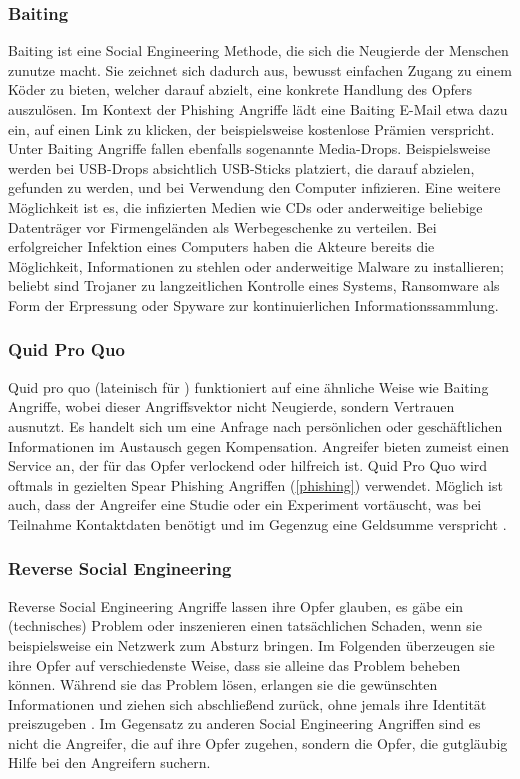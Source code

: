 \subsubsection{Baiting}
\label{baiting}
Baiting ist eine Social Engineering Methode, die sich die Neugierde der Menschen zunutze macht.
Sie zeichnet sich dadurch aus, bewusst einfachen Zugang zu einem Köder zu bieten, welcher darauf abzielt, eine konkrete Handlung
des Opfers auszulösen. Im Kontext der Phishing Angriffe lädt eine Baiting E-Mail etwa dazu ein, auf einen Link zu klicken, der beispielsweise
kostenlose Prämien verspricht. Unter Baiting Angriffe fallen ebenfalls sogenannte Media-Drops. Beispielsweise werden bei USB-Drops absichtlich
USB-Sticks platziert, die darauf abzielen, gefunden zu werden, und bei Verwendung den Computer infizieren. Eine weitere Möglichkeit ist es, die
infizierten Medien wie CDs oder anderweitige beliebige Datenträger vor Firmengeländen als Werbegeschenke zu verteilen. Bei erfolgreicher Infektion eines Computers haben die Akteure bereits
die Möglichkeit, Informationen zu stehlen oder anderweitige Malware zu installieren; beliebt sind Trojaner zu langzeitlichen Kontrolle eines
Systems, Ransomware als Form der Erpressung  oder Spyware zur kontinuierlichen Informationssammlung.

\subsubsection{Quid Pro Quo}
Quid pro quo (lateinisch für ) funktioniert auf eine ähnliche Weise wie Baiting Angriffe, wobei dieser Angriffsvektor nicht
Neugierde, sondern Vertrauen ausnutzt. Es handelt sich um eine Anfrage nach persönlichen oder geschäftlichen Informationen im Austausch gegen Kompensation.
Angreifer bieten zumeist einen Service an, der für das Opfer verlockend oder hilfreich ist. Quid Pro Quo wird oftmals in gezielten
Spear Phishing Angriffen (\autoref{phishing}) verwendet. Möglich ist auch, dass der Angreifer eine Studie oder ein Experiment vortäuscht, was bei Teilnahme Kontaktdaten
benötigt und im Gegenzug eine Geldsumme verspricht .

\subsubsection{Reverse Social Engineering}
Reverse Social Engineering Angriffe lassen ihre Opfer glauben, es gäbe ein (technisches) Problem oder inszenieren einen tatsächlichen Schaden, wenn sie beispielsweise
ein Netzwerk zum Absturz bringen. Im Folgenden überzeugen sie ihre Opfer auf verschiedenste Weise, dass sie alleine das Problem beheben können. Während sie das Problem
lösen, erlangen sie die gewünschten Informationen und ziehen sich abschließend zurück, ohne jemals ihre Identität preiszugeben .
Im Gegensatz zu anderen Social Engineering Angriffen sind es nicht die Angreifer, die auf ihre Opfer zugehen, sondern die Opfer, die gutgläubig Hilfe
bei den Angreifern suchern.

